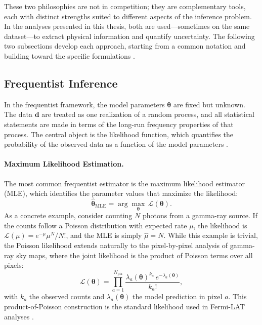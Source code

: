 These two philosophies are not in competition; they are complementary tools, each with distinct strengths suited to different aspects of the inference problem.
In the analyses presented in this thesis, both are used---sometimes on the same dataset---to extract physical information and quantify uncertainty.
The following two subsections develop each approach, starting from a common notation and building toward the specific formulations .


\subsection{Frequentist Inference}
\label{sec:3.1.2}

In the frequentist framework, the model parameters $\boldsymbol{\theta}$ are fixed but unknown.
The data $\mathbf{d}$ are treated as one realization of a random process, and all statistical statements are made in terms of the long-run frequency properties of that process.
The central object is the likelihood function, which quantifies the probability of the observed data as a function of the model parameters \cite{Hastie:2009}.

\paragraph{Maximum Likelihood Estimation.}

The most common frequentist estimator is the maximum likelihood estimator (MLE), which identifies the parameter values that maximize the likelihood:
\begin{equation}
	\hat{\boldsymbol{\theta}}_{\mathrm{MLE}} = \arg\max_{\boldsymbol{\theta}} \, \mathcal{L}(\boldsymbol{\theta}).
	\label{eq:mle}
\end{equation}
As a concrete example, consider counting $N$ photons from a gamma-ray source.
If the counts follow a Poisson distribution with expected rate $\mu$, the likelihood is $\mathcal{L}(\mu) = e^{-\mu} \mu^N / N!
$, and the MLE is simply $\hat{\mu} = N$. While this example is trivial, the Poisson likelihood extends naturally to the pixel-by-pixel analysis of gamma-ray sky maps, where the joint likelihood is the product of Poisson terms over all pixels:
\begin{equation}
	\mathcal{L}(\boldsymbol{\theta}) = \prod_{a=1}^{N_{\mathrm{pix}}} \frac{\lambda_a(\boldsymbol{\theta})^{k_a} \, e^{-\lambda_a(\boldsymbol{\theta})}}{k_a!},
	\label{eq:poisson_likelihood}
\end{equation}
with $k_a$ the observed counts and $\lambda_a(\boldsymbol{\theta})$ the model prediction in pixel $a$.
This product-of-Poisson construction is the standard likelihood used in Fermi-LAT analyses \cite{Mattox:1996zz}.


